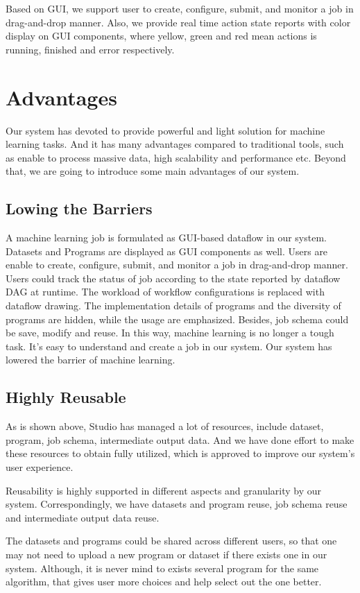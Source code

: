 \documentclass{sig-alternate-05-2015}
\begin{document}
Based on GUI, we support user to create, configure, submit, and monitor a job in drag-and-drop manner. Also, we provide real time action state reports with color display on GUI components, where yellow, green and red mean actions is running, finished and error respectively.

\section{Advantages}
Our system has devoted to provide powerful and light solution for machine learning tasks. And it has many advantages compared to traditional tools, such as enable to process massive data, high scalability and performance etc. Beyond that, we are going to introduce some main advantages of our system.
\subsection{Lowing the Barriers}
A machine learning job is formulated as GUI-based dataflow in our system. Datasets and Programs are displayed as GUI components as well. Users are enable to create, configure, submit, and monitor a job in drag-and-drop manner. Users could track the status of job according to the state reported by dataflow DAG at runtime. The workload of workflow configurations is replaced with dataflow drawing. The implementation details of programs and the diversity of programs are hidden, while the usage are emphasized. Besides, job schema could be save, modify and reuse. In this way, machine learning is no longer a tough task. It's easy to understand and create a job in our system. Our system has lowered the barrier of machine learning.

\subsection{Highly Reusable}
As is shown above, Studio has managed a lot of resources, include dataset, program, job schema, intermediate output data. And we have done effort to make these resources to obtain fully utilized, which is approved to improve our system's user experience.

Reusability is highly supported in different aspects and granularity by our system.  Correspondingly, we have datasets and program reuse, job schema reuse and intermediate output data reuse.

The datasets and programs could be shared across different users, so that one may not need to upload a new program or dataset if there exists one in our system. Although, it is never mind to exists several program for the same algorithm, that gives user more choices and help select out the one better. 
\end{document}
